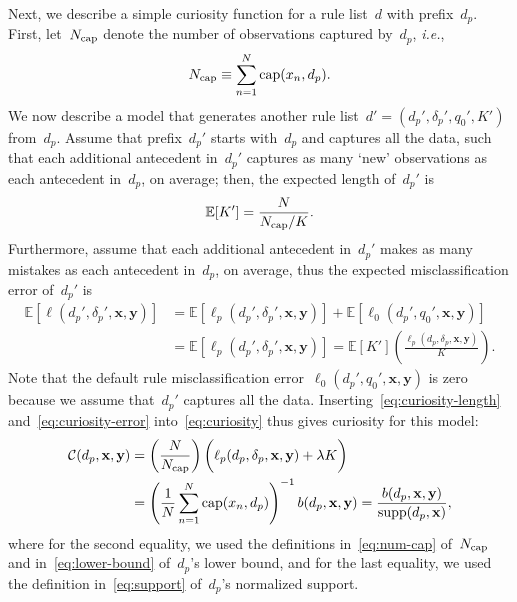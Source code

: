\documentclass[twoside,11pt]{article}
\def\ie{{\it i.e.},~}
\def\E{\mathbb{E}}
\newcommand{\x}{\mathbf{x}}
\newcommand{\y}{\mathbf{y}}
\def\RL{{d}}
\def\Prefix{d_p}
\def\Labels{\delta_p}
\def\Default{q_0}
\def\Loss{\ell}
\def\Reg{{\lambda}}
\def\Cap{\textnormal{cap}}
\def\Supp{\textnormal{supp}}
\def\Curiosity{\mathcal{C}}
\def\NCap{N_{\textnormal{cap}}}
\newcommand{\nn}{\nonumber}
\begin{document}
Next, we describe a simple curiosity function for a rule list~$\RL$ with prefix~$\Prefix$.
%
First, let~$\NCap$ denote the number of observations captured by~$\Prefix$, \ie
\begin{align}
\NCap \equiv \sum_{n=1}^N \Cap(x_n, \Prefix).
\label{eq:num-cap}
\end{align}
We now describe a model that generates another
rule list~${\RL' = (\Prefix', \Labels', \Default', K')}$ from~$\Prefix$.
%
Assume that prefix~$\Prefix'$ starts with~$\Prefix$ and captures all the data,
such that each additional antecedent in~$\Prefix'$
captures as many `new' observations as each antecedent in~$\Prefix$, on average;
then, the expected length of~$\Prefix'$ is
\begin{align}
\E[ K' ] = \frac{N}{\NCap / K}.
\label{eq:curiosity-length}
\end{align}
Furthermore, assume that each additional antecedent in~$\Prefix'$
makes as many mistakes as each antecedent in~$\Prefix$, on average,
thus the expected misclassification error of~$\Prefix'$ is
\begin{align}
\E[\Loss(\Prefix', \Labels', \x, \y)]
&= \E[\Loss_p(\Prefix', \Labels', \x, \y)] + \E[\Loss_0(\Prefix', \Default', \x, \y)] \nn \\
&= \E[\Loss_p(\Prefix', \Labels', \x, \y)]
=  \E[ K' ] \left(\frac{\Loss_p(\Prefix, \Labels, \x, \y)}{K}\right).
\label{eq:curiosity-error}
\end{align}
Note that the default rule misclassification error~$\Loss_0(\Prefix', \Default', \x, \y)$
is zero because we assume that~$\Prefix'$ captures all the data.
%
Inserting~\eqref{eq:curiosity-length} and~\eqref{eq:curiosity-error}
into~\eqref{eq:curiosity} thus gives curiosity for this model:
\begin{align*}
\Curiosity(\Prefix, \x, \y)
&= \left( \frac{N}{\NCap} \right) \biggl(\Loss_p(\Prefix, \Labels, \x, \y) + \Reg K \biggr) \\
&= \left( \frac{1}{N} \sum_{n=1}^N \Cap(x_n, \Prefix) \right)^{-1} b(\Prefix, \x, \y)
= \frac{b(\Prefix, \x, \y)}{\Supp(\Prefix, \x)},
\end{align*}
where for the second equality, we used the definitions in~\eqref{eq:num-cap} of~$\NCap$
and in~\eqref{eq:lower-bound} of~$\Prefix$'s lower bound, and for the last equality,
we used the definition in~\eqref{eq:support} of~$\Prefix$'s normalized support.
\end{document}
